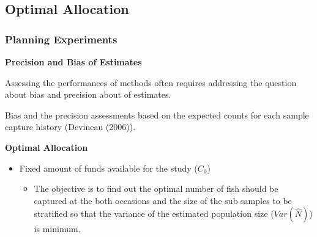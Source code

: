 \documentclass{beamer}
\begin{document}
\subsection{Optimal Allocation}
\begin{frame} \frametitle{Planning Experiments}
\textbf{\scriptsize Precision and Bias of Estimates}

\begin{itemize}
{\scriptsize
\item Assessing the performances of methods often requires addressing the question about bias and precision about of estimates. 
\vspace{6pt}
\item Bias and the precision assessments based on the expected counts for each sample capture history (Devineau (2006)).
}
\end{itemize}


\textbf{\scriptsize Optimal Allocation}
\begin{itemize}
\item {\footnotesize  Fixed amount of funds available for the study ($C_{0}$)}
  \begin{itemize}
 \item {\scriptsize The objective is to find out the optimal  number of fish should be captured  at the both occasions and the size of the sub samples to be stratified so that the  variance of the estimated population size ($Var(\hat{N})$) is minimum.}
 \end{itemize}

\end{itemize}



\end{frame}
\end{document}
